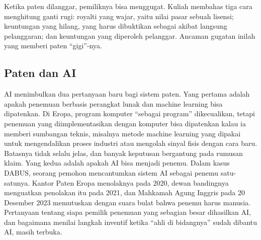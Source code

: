 Ketika paten dilanggar, pemiliknya bisa menggugat. Kuliah membahas tiga cara menghitung ganti rugi: royalti yang wajar, yaitu nilai pasar
sebuah lisensi; keuntungan yang hilang, yang harus dibuktikan sebagai akibat langsung pelanggaran; dan keuntungan yang diperoleh
pelanggar. Ancaman gugatan inilah yang memberi paten ``gigi''-nya.

\subsection{Paten dan AI}

AI menimbulkan dua pertanyaan baru bagi sistem paten. Yang pertama adalah apakah penemuan berbasis perangkat lunak dan machine learning
bisa dipatenkan. Di Eropa, program komputer ``sebagai program'' dikecualikan, tetapi penemuan yang diimplementasikan dengan komputer bisa
dipatenkan kalau ia memberi sumbangan teknis, misalnya metode machine learning yang dipakai untuk mengendalikan proses industri atau
mengolah sinyal fisis dengan cara baru. Batasnya tidak selalu jelas, dan banyak keputusan bergantung pada rumusan klaim. Yang kedua
adalah apakah AI bisa menjadi penemu. Dalam kasus DABUS, seorang pemohon mencantumkan sistem AI sebagai penemu satu-satunya. Kantor
Paten Eropa menolaknya pada 2020, dewan bandingnya menguatkan penolakan itu pada 2021, dan Mahkamah Agung Inggris pada 20 Desember
2023 memutuskan dengan suara bulat bahwa penemu harus manusia. Pertanyaan tentang siapa pemilik penemuan yang sebagian besar
dihasilkan AI, dan bagaimana menilai langkah inventif ketika ``ahli di bidangnya'' sudah dibantu AI, masih terbuka.

